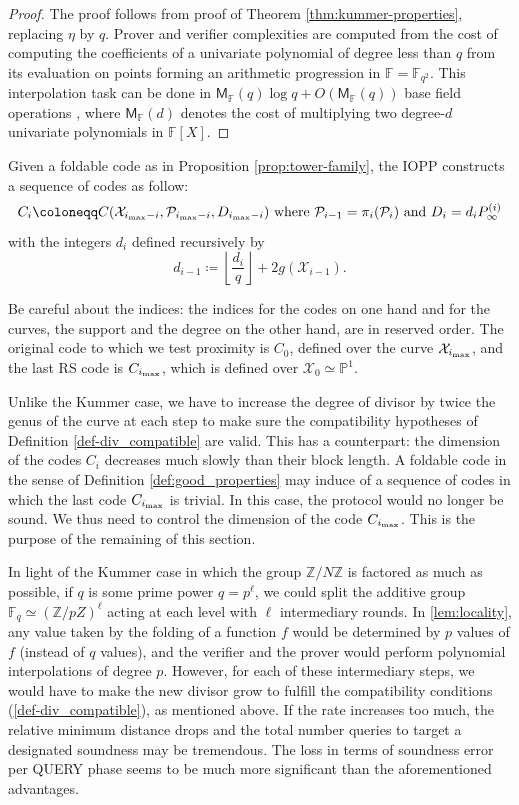 \documentclass[a4paper,USenglish,autoref]{lipics-v2021}
\newcommand\F{\mathbb{F}}
\newcommand\Fq{\mathbb{F}_q}
\newcommand\PP{\mathbb{P}}
\newcommand\Z{\mathbb{Z}}
\newcommand\floor[1]{\left\lfloor #1 \right\rfloor}
\newcommand\calX{\mathcal{X}}
\newcommand\calP{\mathcal{P}}
\newcommand\mydef{\coloneqq}
\newcommand{\ii}{i_{\rm{max}}}
\begin{document}
\begin{proof}
	The proof follows from proof of Theorem \ref{thm:kummer-properties}, replacing $\eta$ by $q$. Prover and verifier complexities are computed from the cost of computing the coefficients of a univariate polynomial of degree less than $q$ from its evaluation on points forming an arithmetic progression in $\F = \F_{q^2}$. This interpolation task can be done in $\mathsf{M}_\F(q)\log q + O(\mathsf{M}_\F(q))$ base field operations \cite{BrS05}, where $\mathsf{M}_\F(d)$ denotes the cost of multiplying two degree-$d$ univariate polynomials in $\F[X]$.
\end{proof}



Given a foldable code as in Proposition \ref{prop:tower-family}, the IOPP constructs a sequence of codes as follow:
\[C_i \mydef C(\calX_{\ii-i},\calP_{\ii-i},D_{\ii-i}) \text{ where } \calP_{i-1}=\pi_i(\calP_i)\text{ and } D_i = d_iP^{(i)}_{\infty} \]
with the integers $d_i$ defined recursively by
\[
d_{i-1} \mydef \floor{ \dfrac{d_i}{q}} + 2g(\calX_{i-1}).
\]
\begin{remark}
	Be careful about the indices: the indices for the codes on one hand and for the curves, the support and the degree on the other hand, are in reserved order. The original code to which we test proximity is $C_0$, defined over the curve $\calX_{\ii}$, and the last RS code is $C_{\ii}$, which is defined over $\calX_0\simeq \PP^1$.
\end{remark}

Unlike the Kummer case, we have to increase the degree of divisor by twice the genus of the curve at each step to make sure the compatibility hypotheses of Definition \ref{def-div_compatible} are valid. This has a counterpart: the dimension of the codes $C_i$ decreases much slowly than their block length. A foldable code in the sense of Definition \ref{def:good_properties} may induce of a sequence of codes in which the last code $C_{\ii}$ is trivial. In this case, the protocol would no longer be sound. We thus need to control the dimension of the code $C_{\ii}$. This is the purpose of the remaining of this section.

\begin{remark}
	In light of the Kummer case in which the group $\Z/N\Z$ is factored as much as possible, if $q$ is some prime power $q=p^\ell$, we could split the additive group $\Fq \simeq \left(\Z/pZ\right)^\ell$ acting at each level with $\ell$ intermediary rounds. In \ref{lem:locality}, any value taken by the folding of a function $f$ would be determined by $p$ values of $f$ (instead of $q$ values), and the verifier and the prover would perform polynomial interpolations of degree $p$. However, for each of these intermediary steps, we would have to make the new divisor grow to fulfill the compatibility conditions (\autoref{def-div_compatible}), as mentioned above. If the rate increases too much, the relative minimum distance drops and the total number queries to target a designated soundness may be tremendous. The loss in terms of soundness error per \textsf{QUERY} phase seems to be much more significant than the aforementioned advantages. 
\end{remark}
\end{document}
